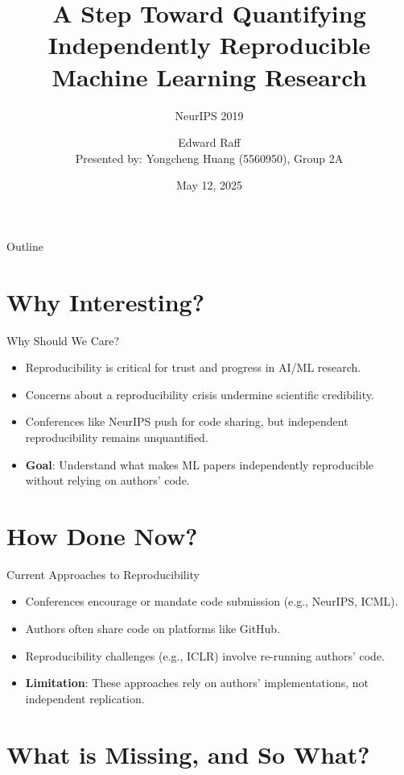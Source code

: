 \documentclass[10pt]{beamer}
\title{A Step Toward Quantifying Independently Reproducible Machine Learning Research}
\subtitle{NeurIPS 2019}
\author{Edward Raff \\[0.5cm] Presented by: Yongcheng Huang (5560950), Group 2A}
\institute{Booz Allen Hamilton \& University of Maryland, Baltimore County}
\date{May 12, 2025}
\begin{document}
\begin{frame}
    \titlepage
\end{frame}

\begin{frame}{Outline}
    \tableofcontents
\end{frame}

\section{Why Interesting?}

\begin{frame}{Why Should We Care?}
    \begin{itemize}
        \item Reproducibility is critical for trust and progress in AI/ML research.
        \item Concerns about a reproducibility crisis undermine scientific credibility.
        \item Conferences like NeurIPS push for code sharing, but independent reproducibility remains unquantified.
        \item \textbf{Goal}: Understand what makes ML papers independently reproducible without relying on authors' code.
    \end{itemize}
\end{frame}

\section{How Done Now?}

\begin{frame}{Current Approaches to Reproducibility}
    \begin{itemize}
        \item Conferences encourage or mandate code submission (e.g., NeurIPS, ICML).
        \item Authors often share code on platforms like GitHub.
        \item Reproducibility challenges (e.g., ICLR) involve re-running authors' code.
        \item \textbf{Limitation}: These approaches rely on authors' implementations, not independent replication.
    \end{itemize}
\end{frame}

\section{What is Missing, and So What?}
\end{document}
